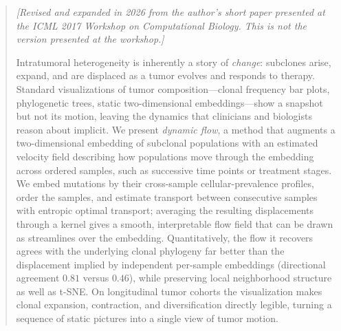 \documentclass{article}
\begin{document}

\printAffiliationsAndNotice{}

\begin{abstract}
\noindent\textit{[Revised and expanded in 2026 from the author's short paper presented at the ICML 2017 Workshop on Computational Biology. This is not the version presented at the workshop.]}\par\smallskip

Intratumoral heterogeneity is inherently a story of \emph{change}: subclones arise,
expand, and are displaced as a tumor evolves and responds to therapy. Standard
visualizations of tumor composition---clonal frequency bar plots, phylogenetic trees,
static two-dimensional embeddings---show a snapshot but not its motion, leaving the
dynamics that clinicians and biologists reason about implicit. We present
\emph{dynamic flow}, a method that augments a two-dimensional embedding of subclonal
populations with an estimated velocity field describing how populations move through
the embedding across ordered samples, such as successive time points or treatment
stages. We embed mutations by their cross-sample cellular-prevalence profiles, order
the samples, and estimate transport between consecutive samples with entropic optimal
transport; averaging the resulting displacements through a kernel gives a smooth,
interpretable flow field that can be drawn as streamlines over the embedding.
Quantitatively, the flow it recovers agrees with the underlying clonal phylogeny far
better than the displacement implied by independent per-sample embeddings
(directional agreement $0.81$ versus $0.46$), while preserving local neighborhood
structure as well as t-SNE. On longitudinal tumor cohorts the visualization makes
clonal expansion, contraction, and diversification directly legible, turning a
sequence of static pictures into a single view of tumor motion.
\end{abstract}
\end{document}
